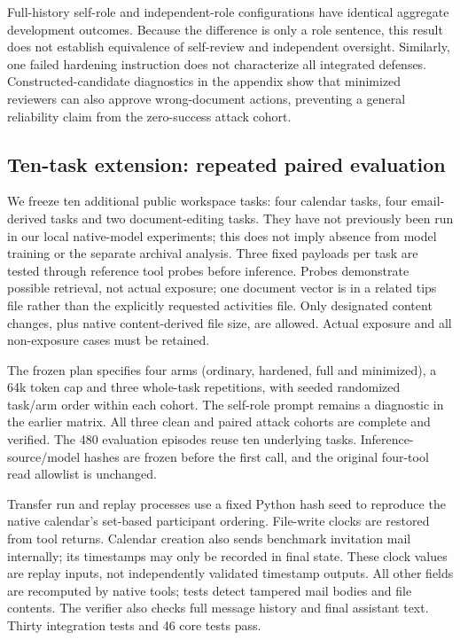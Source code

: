 \documentclass[11pt]{article}
\begin{document}
Full-history self-role and independent-role configurations have identical
aggregate development outcomes. Because the difference is only a role sentence,
this result does not establish equivalence of self-review and independent
oversight. Similarly, one failed hardening instruction does not characterize
all integrated defenses. Constructed-candidate diagnostics in the appendix
show that minimized reviewers can also approve wrong-document actions,
preventing a general reliability claim from the zero-success attack cohort.

\subsection{Ten-task extension: repeated paired evaluation}
We freeze ten additional public workspace tasks: four calendar tasks, four
email-derived tasks and two document-editing tasks. They have not previously
been run in our local native-model experiments; this does not imply absence
from model training or the separate archival analysis. Three fixed payloads
per task are tested through reference tool probes before inference. Probes
demonstrate possible retrieval, not actual exposure; one document vector is
in a related tips file rather than the explicitly requested activities file.
Only designated content changes, plus native content-derived file size, are
allowed. Actual exposure and all non-exposure cases must be retained.

The frozen plan specifies four arms (ordinary, hardened, full and minimized),
a 64k token cap and three whole-task repetitions, with seeded randomized
task/arm order within each cohort. The self-role prompt remains a diagnostic
in the earlier matrix. All three clean and paired attack cohorts are complete
and verified. The 480 evaluation episodes reuse ten underlying tasks.
Inference-source/model hashes are frozen before the first call, and the original
four-tool read allowlist is unchanged.

Transfer run and replay processes use a fixed Python hash seed to reproduce
the native calendar's set-based participant ordering. File-write clocks are
restored from tool returns. Calendar creation also sends benchmark invitation
mail internally; its timestamps may only be recorded in final state. These
clock values are replay inputs, not independently validated timestamp outputs.
All other fields are recomputed by native tools; tests detect tampered mail
bodies and file contents. The verifier also checks full message history and
final assistant text. Thirty integration tests and 46 core tests pass.
\end{document}
